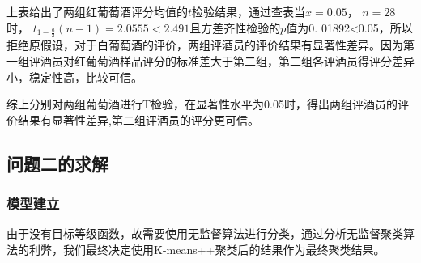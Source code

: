 \documentclass[UTF8]{ctexart}
\begin{document}
上表给出了两组红葡萄酒评分均值的$t$检验结果，通过查表当$x=0.05$， $n=28$时， $t_{1-\frac{a}{2}}(n-1)=2.0555<2.491$且方差齐性检验的$p$值为0. 01892<0.05，所以拒绝原假设，对于白葡萄酒的评价，两组评酒员的评价结果有显著性差异。因为第一组评酒员对红葡萄酒样品评分的标准差大于第二组，第二组各评酒员得评分差异小，稳定性高，比较可信。

综上分别对两组葡萄酒进行T检验\cite{de2013using}，在显著性水平为0.05时，得出两组评酒员的评价结果有显著性差异,第二组评酒员的评分更可信。

\subsection{问题二的求解}
\subsubsection{模型建立}
由于没有目标等级函数，故需要使用无监督算法进行分类，通过分析无监督聚类算法的利弊，我们最终决定使用K-means++聚类后的结果作为最终聚类结果。
\end{document}
